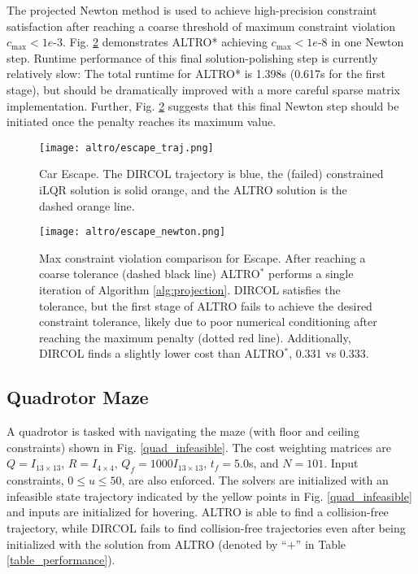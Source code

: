 \documentclass[../root.tex]{subfiles}
\begin{document}
    The projected Newton method is used to achieve high-precision constraint
    satisfaction after reaching a coarse threshold of maximum constraint
    violation $c_{\max} < 1e\text{-}3$. Fig. \ref{escape_newton} demonstrates
    ALTRO* achieving $c_{\max} < 1e\text{-}8$ in one Newton step. Runtime
    performance of this final solution-polishing step is currently relatively
    slow: The total runtime for ALTRO* is 1.398s (0.617s for the first
    stage), but should be dramatically improved with a more careful sparse
    matrix implementation. Further, Fig. \ref{escape_newton} suggests that
    this final Newton step should be initiated once the penalty reaches its
    maximum value.
    
    \begin{figure}
      \centering
      \setlength{\fboxrule}{0pt}
      \texttt{[image: altro/escape\_traj.png]}
      \caption{Car Escape. The DIRCOL trajectory is blue, the (failed)
      constrained iLQR solution is solid orange, and the ALTRO solution is
      the dashed orange line.}
      \label{escape_traj}
    \end{figure}
    
    \begin{figure}
       \centering
       \texttt{[image: altro/escape\_newton.png]}
       \caption{Max constraint violation comparison for Escape. After
       reaching a coarse tolerance (dashed black line) ALTRO$^*$ performs a
       single iteration of Algorithm \ref{alg:projection}. DIRCOL
       satisfies the tolerance, but the first stage of ALTRO fails to achieve
       the desired constraint tolerance, likely due to poor numerical
       conditioning after reaching the maximum penalty (dotted red line).
       Additionally, DIRCOL finds a slightly lower cost than ALTRO$^*$, 0.331
       vs 0.333.}
       \label{escape_newton}
   \end{figure}
    
\subsection{Quadrotor Maze}
    A quadrotor is tasked with navigating the maze (with floor and ceiling
    constraints) shown in Fig. \ref{quad_infeasible}. The cost weighting
    matrices are $Q = I_{13 \times 13}$, $R = I_{4 \times 4}$, $Q_f =
    1000I_{13 \times 13}$, $t_f = 5.0$s, and $N = 101$. Input constraints, $0
    \leq u \leq 50$, are also enforced. The solvers are initialized with an
    infeasible state trajectory indicated by the yellow points in Fig.
    \ref{quad_infeasible} and inputs are initialized for hovering. ALTRO is
    able to find a collision-free trajectory, while DIRCOL fails to find
    collision-free trajectories even after being initialized with the
    solution from ALTRO (denoted by ``$+$'' in Table
    \ref{table_performance}).
    
\end{document}
